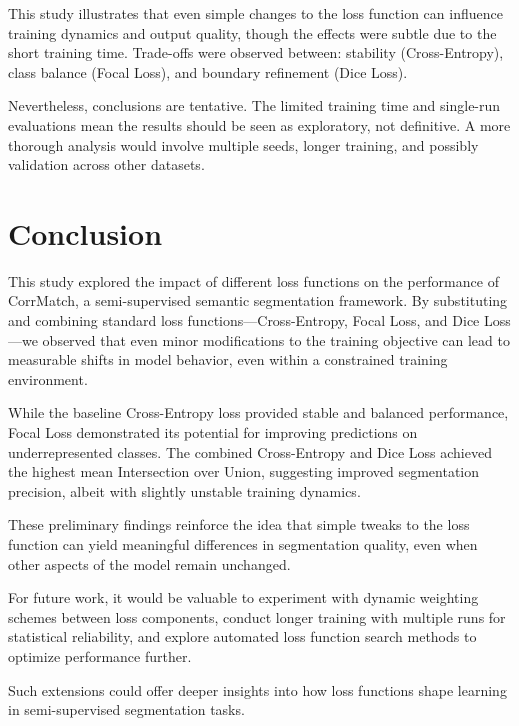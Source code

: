 \documentclass[10pt,twocolumn,letterpaper]{article}
\begin{document}
This study illustrates that even simple changes to the loss function can influence training dynamics and output quality, though the effects were subtle due to the short training time. Trade-offs were observed between: stability (Cross-Entropy), class balance (Focal Loss), and boundary refinement (Dice Loss).

Nevertheless, conclusions are tentative. The limited training time and single-run evaluations mean the results should be seen as exploratory, not definitive. A more thorough analysis would involve multiple seeds, longer training, and possibly validation across other datasets.


\section{Conclusion}
This study explored the impact of different loss functions on the performance of CorrMatch, a semi-supervised semantic segmentation framework. By substituting and combining standard loss functions—Cross-Entropy, Focal Loss, and Dice Loss—we observed that even minor modifications to the training objective can lead to measurable shifts in model behavior, even within a constrained training environment.

While the baseline Cross-Entropy loss provided stable and balanced performance, Focal Loss demonstrated its potential for improving predictions on underrepresented classes. The combined Cross-Entropy and Dice Loss achieved the highest mean Intersection over Union, suggesting improved segmentation precision, albeit with slightly unstable training dynamics.

These preliminary findings reinforce the idea that simple tweaks to the loss function can yield meaningful differences in segmentation quality, even when other aspects of the model remain unchanged.

For future work, it would be valuable to experiment with dynamic weighting schemes between loss components, conduct longer training with multiple runs for statistical reliability, and explore automated loss function search methods to optimize performance further.

Such extensions could offer deeper insights into how loss functions shape learning in semi-supervised segmentation tasks.



{\small


}
\end{document}
